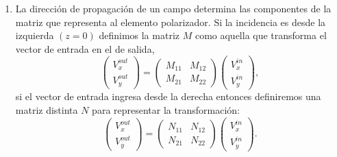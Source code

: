 \begin{enumerate}
\item La dirección de propagación de un campo determina las
  componentes de la matriz que representa al elemento polarizador. Si
  la incidencia es desde la izquierda $(z=0)$ definimos la matriz $M$ como aquella
  que transforma el vector de entrada en el de salida,
  \begin{equation}
    \begin{pmatrix}
      V_x^{out}\\V_y^{out}
    \end{pmatrix}
    =
    \begin{pmatrix}
      M_{11}&M_{12}\\M_{21} & M_{22}
    \end{pmatrix}
    \begin{pmatrix}
      V_x^{in}\\V_y^{in}
    \end{pmatrix},
    \label{eq:right_propagation}
  \end{equation}
si el vector de entrada ingresa desde la derecha entonces
definiremos una matriz distinta $N$ para representar la transformación:
  \begin{equation*}
    \begin{pmatrix}
      V_x^{out}\\V_y^{out}
    \end{pmatrix}
    =
    \begin{pmatrix}
      N_{11}&N_{12}\\N_{21} & N_{22}
    \end{pmatrix}
    \begin{pmatrix}
      V_x^{in}\\V_y^{in}
    \end{pmatrix}.
  \end{equation*}


\end{enumerate}
